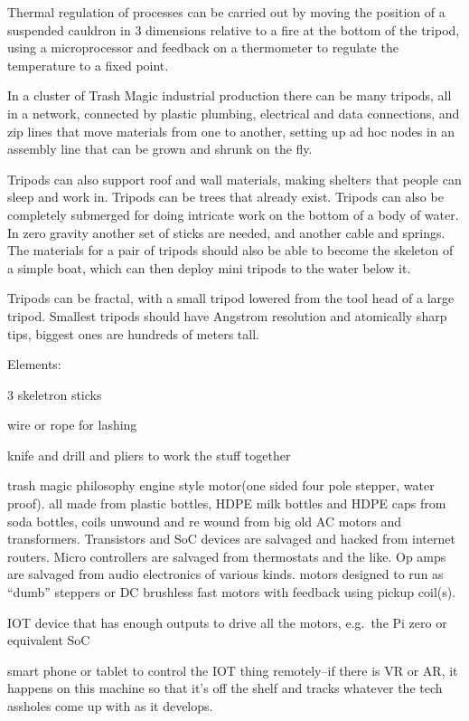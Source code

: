 Thermal regulation of processes can be carried out by moving the
position of a suspended cauldron in 3 dimensions relative to a fire at
the bottom of the tripod, using a microprocessor and feedback on a
thermometer to regulate the temperature to a fixed point.

In a cluster of Trash Magic industrial production there can be many
tripods, all in a network, connected by plastic plumbing, electrical and
data connections, and zip lines that move materials from one to another,
setting up ad hoc nodes in an assembly line that can be grown and shrunk
on the fly.

Tripods can also support roof and wall materials, making shelters that
people can sleep and work in. Tripods can be trees that already exist.
Tripods can also be completely submerged for doing intricate work on the
bottom of a body of water. In zero gravity another set of sticks are
needed, and another cable and springs. The materials for a pair of
tripods should also be able to become the skeleton of a simple boat,
which can then deploy mini tripods to the water below it.

Tripods can be fractal, with a small tripod lowered from the tool head
of a large tripod. Smallest tripods should have Angstrom resolution and
atomically sharp tips, biggest ones are hundreds of meters tall.

Elements:

3 skeletron sticks

wire or rope for lashing

knife and drill and pliers to work the stuff together

trash magic philosophy engine style motor(one sided four pole stepper,
water proof). all made from plastic bottles, HDPE milk bottles and HDPE
caps from soda bottles, coils unwound and re wound from big old AC
motors and transformers. Transistors and SoC devices are salvaged and
hacked from internet routers. Micro controllers are salvaged from
thermostats and the like. Op amps are salvaged from audio electronics of
various kinds. motors designed to run as ``dumb'' steppers or DC
brushless fast motors with feedback using pickup coil(s).

IOT device that has enough outputs to drive all the motors, e.g.~the Pi
zero or equivalent SoC

smart phone or tablet to control the IOT thing remotely--if there is VR
or AR, it happens on this machine so that it's off the shelf and tracks
whatever the tech assholes come up with as it develops.


